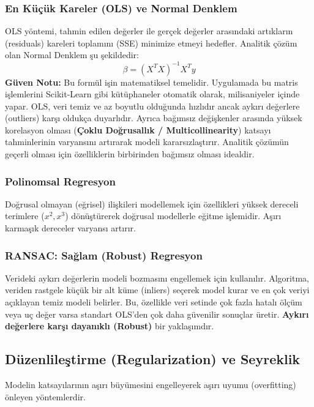\documentclass[12pt,a4paper]{article}
\begin{document}
\subsubsection{En Küçük Kareler (OLS) ve Normal Denklem}
OLS yöntemi, tahmin edilen değerler ile gerçek değerler arasındaki artıkların (residuals) kareleri toplamını (SSE) minimize etmeyi hedefler. Analitik çözüm olan Normal Denklem şu şekildedir:
\begin{equation}
    \beta = (X^T X)^{-1} X^T y
\end{equation}
\textbf{Güven Notu:} Bu formül işin matematiksel temelidir. Uygulamada bu matris işlemlerini Scikit-Learn gibi kütüphaneler otomatik olarak, milisaniyeler içinde yapar.
OLS, veri temiz ve az boyutlu olduğunda hızlıdır ancak aykırı değerlere (outliers) karşı oldukça duyarlıdır. Ayrıca bağımsız değişkenler arasında yüksek korelasyon olması (\textbf{Çoklu Doğrusallık / Multicollinearity}) katsayı tahminlerinin varyansını artırarak modeli kararsızlaştırır. Analitik çözümün geçerli olması için özelliklerin birbirinden bağımsız olması idealdir.

\subsubsection{Polinomsal Regresyon}
Doğrusal olmayan (eğrisel) ilişkileri modellemek için özellikleri yüksek dereceli terimlere ($x^2, x^3$) dönüştürerek doğrusal modellerle eğitme işlemidir. Aşırı karmaşık dereceler varyansı artırır.

\subsubsection{RANSAC: Sağlam (Robust) Regresyon}
Verideki aykırı değerlerin modeli bozmasını engellemek için kullanılır. Algoritma, veriden rastgele küçük bir alt küme (inliers) seçerek model kurar ve en çok veriyi açıklayan temiz modeli belirler. Bu, özellikle veri setinde çok fazla hatalı ölçüm veya uç değer varsa standart OLS'den çok daha güvenilir sonuçlar üretir. \textbf{Aykırı değerlere karşı dayanıklı (Robust)} bir yaklaşımdır.

\subsection{Düzenlileştirme (Regularization) ve Seyreklik}
Modelin katsayılarının aşırı büyümesini engelleyerek aşırı uyumu (overfitting) önleyen yöntemlerdir.
\end{document}
